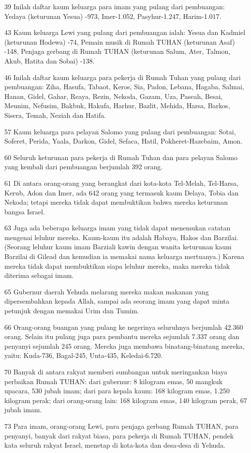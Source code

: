 \par 39 Inilah daftar kaum keluarga para imam yang pulang dari pembuangan: Yedaya (keturunan Yesua) -973, Imer-1.052, Pasyhur-1.247, Harim-1.017.
\par 43 Kaum keluarga Lewi yang pulang dari pembuangan ialah: Yesua dan Kadmiel (keturunan Hodewa) -74, Pemain musik di Rumah TUHAN (keturunan Asaf) -148, Penjaga gerbang di Rumah TUHAN (keturunan Salum, Ater, Talmon, Akub, Hatita dan Sobai) -138.
\par 46 Inilah daftar kaum keluarga para pekerja di Rumah Tuhan yang pulang dari pembuangan: Ziha, Hasufa, Tabaot, Keros, Sia, Padon, Lebana, Hagaba, Salmai, Hanan, Gidel, Gahar, Reaya, Rezin, Nekoda, Gazam, Uza, Paseah, Besai, Meunim, Nefusim, Bakbuk, Hakufa, Harhur, Bazlit, Mehida, Harsa, Barkos, Sisera, Temah, Neziah dan Hatifa.
\par 57 Kaum keluarga para pelayan Salomo yang pulang dari pembuangan: Sotai, Soferet, Perida, Yaala, Darkon, Gidel, Sefaca, Hatil, Pokheret-Hazebaim, Amon.
\par 60 Seluruh keturunan para pekerja di Rumah Tuhan dan para pelayan Salomo yang kembali dari pembuangan berjumlah 392 orang.
\par 61 Di antara orang-orang yang berangkat dari kota-kota Tel-Melah, Tel-Harsa, Kerub, Adon dan Imer, ada 642 orang yang termasuk kaum Delaya, Tobia dan Nekoda; tetapi mereka tidak dapat membuktikan bahwa mereka keturunan bangsa Israel.
\par 63 Juga ada beberapa keluarga imam yang tidak dapat menemukan catatan mengenai leluhur mereka. Kaum-kaum itu adalah Habaya, Hakos dan Barzilai. (Seorang leluhur kaum imam Barziali kawin dengan wanita keturunan kaum Barzilai di Gilead dan kemudian ia memakai nama keluarga mertuanya.) Karena mereka tidak dapat membuktikan siapa leluhur mereka, maka mereka tidak diterima sebagai imam.
\par 65 Gubernur daerah Yehuda melarang mereka makan makanan yang dipersembahkan kepada Allah, sampai ada seorang imam yang dapat minta petunjuk dengan memakai Urim dan Tumim.
\par 66 Orang-orang buangan yang pulang ke negerinya seluruhnya berjumlah 42.360 orang. Selain itu pulang juga para pembantu mereka sejumlah 7.337 orang dan penyanyi sejumlah 245 orang. Mereka juga membawa binatang-binatang mereka, yaitu: Kuda-736, Bagal-245, Unta-435, Keledai-6.720.
\par 70 Banyak di antara rakyat memberi sumbangan untuk meringankan biaya perbaikan Rumah TUHAN: dari gubernur: 8 kilogram emas, 50 mangkuk upacara, 530 jubah imam; dari para kepala kaum: 168 kilogram emas, 1.250 kilogram perak; dari orang-orang lain: 168 kilogram emas, 140 kilogram perak, 67 jubah imam.
\par 73 Para imam, orang-orang Lewi, para penjaga gerbang Rumah TUHAN, para penyanyi, banyak dari rakyat biasa, para pekerja di Rumah TUHAN, pendek kata seluruh rakyat Israel, menetap di kota-kota dan desa-desa di Yehuda.


